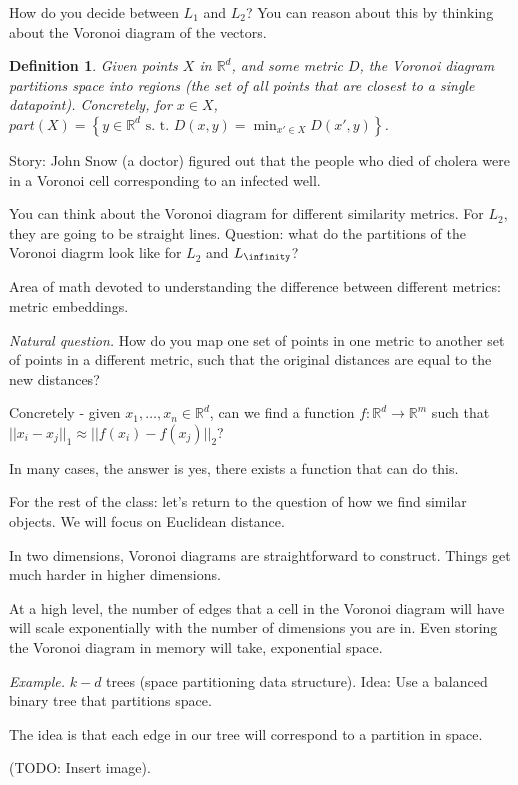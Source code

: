 \documentclass[12pt]{article}
\newtheorem*{definition}{Definition}
\newcommand{\RR}{\mathbb{R}}
\begin{document}
How do you decide between $L_1$ and $L_2$?  You can reason about this by thinking about the Voronoi diagram of the vectors.

\begin{definition}
  Given points $X$ in $\RR^d$, and some metric $D$, the Voronoi diagram partitions space into regions (the set of all points that are closest to a single datapoint).  Concretely, for $x \in X$, $part(X) = \left\{ y \in \RR^d \text{ s. t. } D(x, y) = \min_{x' \in X} D(x', y) \right\}$.
\end{definition}

Story: John Snow (a doctor) figured out that the people who died of cholera were in a Voronoi cell corresponding to an infected well.

You can think about the Voronoi diagram for different similarity metrics.  For $L_2$, they are going to be straight lines.  Question: what do the partitions of the Voronoi diagrm look like for $L_2$ and $L_\infinity$?

Area of math devoted to understanding the difference between different metrics: metric embeddings.

{\it Natural question.} How do you map one set of points in one metric to another set of points in a different metric, such that the original distances are equal to the new distances?

Concretely - given $x_1, \dots, x_n \in \RR^d$, can we find a function $f: \RR^d \to \RR^m$ such that $||x_i - x_j||_1 \approx ||f(x_i) - f(x_j)||_2$?

In many cases, the answer is yes, there exists a function that can do this.

For the rest of the class: let's return to the question of how we find similar objects.  We will focus on Euclidean distance.

In two dimensions, Voronoi diagrams are straightforward to construct.  Things get much harder in higher dimensions.

At a high level, the number of edges that a cell in the Voronoi diagram will have will scale exponentially with the number of dimensions you are in. Even storing the Voronoi diagram in memory will take, exponential space.

{\it Example.} $k-d$ trees (space partitioning data structure). Idea: Use a balanced binary tree that partitions space.

The idea is that each edge in our tree will correspond to a partition in space.

(TODO: Insert image).
\end{document}
